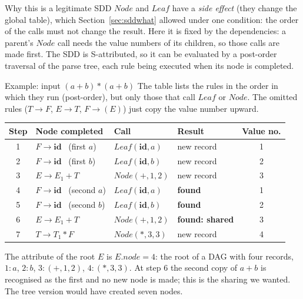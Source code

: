\documentclass[11pt,a4paper]{article}
\newcommand{\at}[2]{\ensuremath{#1.\mathit{#2}}}
\begin{document}
\begin{notebox}{Why this is a legitimate SDD}
$\mathit{Node}$ and $\mathit{Leaf}$ have a \emph{side effect} (they change the global table), which Section~\ref{sec:sddwhat} allowed under one condition: the order of the calls must not change the result. Here it is fixed by the dependencies: a parent's $\mathit{Node}$ call needs the value numbers of its children, so those calls are made first. The SDD is S-attributed, so it can be evaluated by a post-order traversal of the parse tree, each rule being executed when its node is completed.
\end{notebox}

\begin{examplebox}{Example: input $(a+b)*(a+b)$}
The table lists the rules in the order in which they run (post-order), but only those that call $\mathit{Leaf}$ or $\mathit{Node}$. The omitted rules ($T\to F$, $E\to T$, $F\to(E)$) just copy the value number upward.
\begin{center}
\small
\begin{tabular}{@{}c l l l c@{}}
\toprule
\textbf{Step} & \textbf{Node completed} & \textbf{Call} & \textbf{Result} & \textbf{Value no.} \\ \midrule
1 & $F \to \mathbf{id}$ \ (first $a$) & $\mathit{Leaf}(\mathbf{id},a)$ & new record & 1 \\
2 & $F \to \mathbf{id}$ \ (first $b$) & $\mathit{Leaf}(\mathbf{id},b)$ & new record & 2 \\
3 & $E \to E_1 + T$ & $\mathit{Node}(+,1,2)$ & new record & 3 \\
4 & $F \to \mathbf{id}$ \ (second $a$) & $\mathit{Leaf}(\mathbf{id},a)$ & \textbf{found} & 1 \\
5 & $F \to \mathbf{id}$ \ (second $b$) & $\mathit{Leaf}(\mathbf{id},b)$ & \textbf{found} & 2 \\
6 & $E \to E_1 + T$ & $\mathit{Node}(+,1,2)$ & \textbf{found: shared} & 3 \\
7 & $T \to T_1 * F$ & $\mathit{Node}(*,3,3)$ & new record & 4 \\ \bottomrule
\end{tabular}
\end{center}
The attribute of the root $E$ is $\at{E}{node}=4$: the root of a DAG with four records, $1\!:\!a$, $2\!:\!b$, $3\!:\!(+,1,2)$, $4\!:\!(*,3,3)$. At step 6 the second copy of $a+b$ is recognised as the first and no new node is made; this is the sharing we wanted. The tree version would have created seven nodes.
\end{examplebox}
\end{document}
